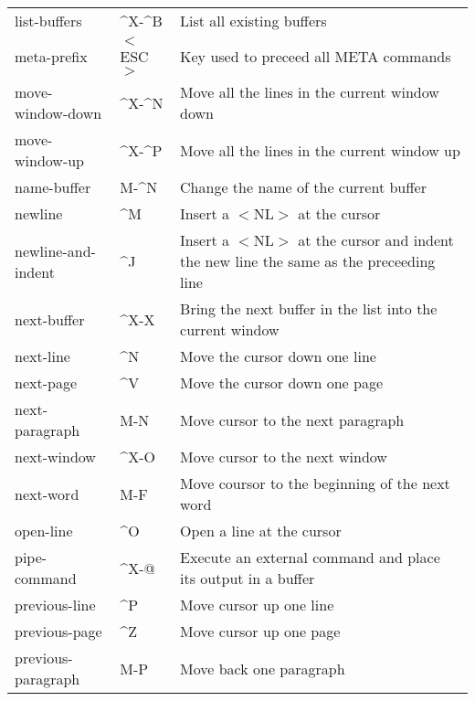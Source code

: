 \begin{tabular}{llp{283pt}}
list-buffers &  \^{}X-\^{}B & List all existing buffers\\

meta-prefix &  $<${}ESC$>${} & Key used to preceed all META commands\\

move-window-down & \^{}X-\^{}N & Move all the lines in the current
window down\\

move-window-up & \^{}X-\^{}P & Move all the lines in the current
window up\\

name-buffer &  M-\^{}N & Change the name of the current buffer\\

newline  &  \^{}M & Insert a $<${}NL$>${} at the cursor\\

newline-and-indent &  \^{}J & Insert a $<${}NL$>${} at the cursor and indent
the new line the same as the preceeding line\\

next-buffer &  \^{}X-X & Bring the next buffer in the list into
the current window\\

next-line &  \^{}N & Move the cursor down one line\\

next-page &  \^{}V & Move the cursor down one page\\

next-paragraph &  M-N & Move cursor to the next paragraph\\

next-window &  \^{}X-O & Move cursor to the next window\\

next-word &  M-F & Move coursor to the beginning of the
next word\\

open-line &  \^{}O & Open a line at the cursor\\

pipe-command &  \^{}X-@ & Execute an external command and place
its output in a buffer\\

previous-line &  \^{}P & Move cursor up one line\\

previous-page &  \^{}Z & Move cursor up one page\\

previous-paragraph &  M-P & Move back one paragraph\\


\end{tabular}
